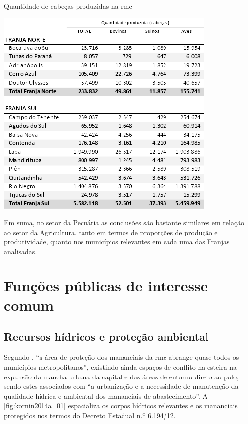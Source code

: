 	\begin{table}[h]
		\centering
		\caption{Quantidade de cabeças produzidas na \gls{rmc}}
		\includegraphics{img/rural_B}
		\label{tab:rural_B}
	\end{table}

	Em suma, no setor da Pecuária as conclusões são bastante similares em relação ao setor da Agricultura, tanto em termos de proporções de produção e produtividade, quanto nos municípios relevantes em cada uma das Franjas analisadas.

	\section{Funções públicas de interesse comum}
	
	\subsection{Recursos hídricos e proteção ambiental}
	
	Segundo , ``a área de proteção dos mananciais da \gls{rmc} abrange quase todos os municípios metropolitanos'', existindo ainda espaços de conflito na esteira na expansão da mancha urbana da capital e das áreas de entorno direto ao polo, sendo estes associados com ``a urbanização e a necessidade de manutenção da qualidade hídrica e ambiental dos mananciais de abastecimento''. A \autoref{fig:kornin2014a_01} espacializa os corpos hídricos relevantes e os mananciais protegidos nos termos do Decreto Estadual n.º 6.194/12.
	
